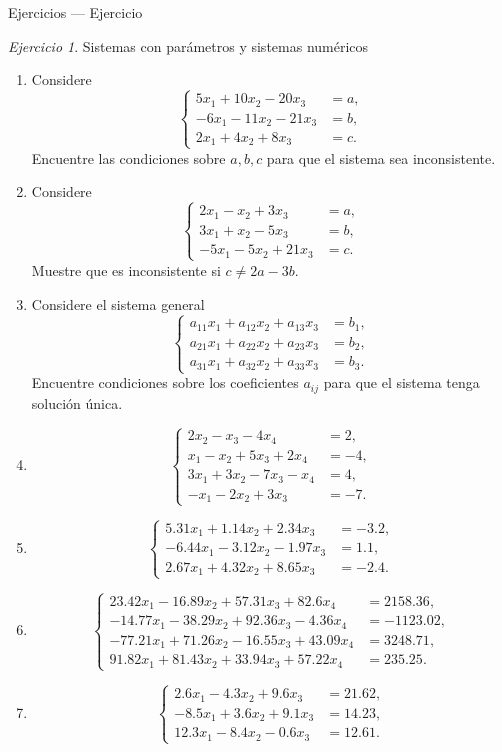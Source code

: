 \documentclass[aspectratio=169,11pt]{beamer}
\theoremstyle{remark}
\newtheorem{Ejer}[definicion]{Ejercicio}
\newcommand{\sistema}[1]{\[\left\{\begin{aligned}#1\end{aligned}\right.\]}
\begin{document}
\begin{frame}[shrink=5]{Ejercicios — Ejercicio}
\footnotesize
\begin{Ejer}  Sistemas con parámetros y sistemas numéricos

\begin{enumerate}[resume]

\item Considere
\sistema{
5x_1+10x_2-20x_3&=a,\\
-6x_1-11x_2-21x_3&=b,\\
2x_1+4x_2+8x_3&=c.
}
Encuentre las condiciones sobre $a,b,c$ para que el sistema sea inconsistente.

\item Considere
\sistema{
2x_1-x_2+3x_3&=a,\\
3x_1+x_2-5x_3&=b,\\
-5x_1-5x_2+21x_3&=c.
}
Muestre que es inconsistente si $c\neq 2a-3b$.

\item Considere el sistema general
\sistema{
a_{11}x_1+a_{12}x_2+a_{13}x_3&=b_1,\\
a_{21}x_1+a_{22}x_2+a_{23}x_3&=b_2,\\
a_{31}x_1+a_{32}x_2+a_{33}x_3&=b_3.
}
Encuentre condiciones sobre los coeficientes $a_{ij}$ para que el sistema tenga solución única.

\item \sistema{
2x_2-x_3-4x_4&=2,\\
x_1-x_2+5x_3+2x_4&=-4,\\
3x_1+3x_2-7x_3-x_4&=4,\\
-x_1-2x_2+3x_3&=-7.
}

\item \sistema{
5.31x_1+1.14x_2+2.34x_3&=-3.2,\\
-6.44x_1-3.12x_2-1.97x_3&=1.1,\\
2.67x_1+4.32x_2+8.65x_3&=-2.4.
}

\item \sistema{
23.42x_1-16.89x_2+57.31x_3+82.6x_4&=2158.36,\\
-14.77x_1-38.29x_2+92.36x_3-4.36x_4&=-1123.02,\\
-77.21x_1+71.26x_2-16.55x_3+43.09x_4&=3248.71,\\
91.82x_1+81.43x_2+33.94x_3+57.22x_4&=235.25.
}

\item \sistema{
2.6x_1-4.3x_2+9.6x_3&=21.62,\\
-8.5x_1+3.6x_2+9.1x_3&=14.23,\\
12.3x_1-8.4x_2-0.6x_3&=12.61.
}


\end{enumerate}
\end{Ejer}
\end{frame}
\end{document}
